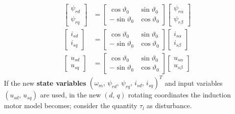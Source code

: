 \documentclass[11pt,a4paper,oneside]{book}
\numberwithin{equation}{section}
\theoremstyle{it}
\theoremstyle{definition}
\begin{document}
\begin{equation}\label{im_eq_40}
	\begin{aligned}
		\left[
		\begin{matrix}
			\psi_{rd} \\[6pt]
			\psi_{rq}
		\end{matrix}
		\right] & =
		\left[
		\begin{matrix}
			\cos\vartheta_0 & \sin\vartheta_0 \\[6pt]
			-\sin\vartheta_0 & \cos\vartheta_0 
		\end{matrix}
		\right]
		\left[
		\begin{matrix}
			\psi_{r\alpha} \\[6pt]
			\psi_{r\beta}
		\end{matrix}
		\right] \\[6pt]
		\left[
		\begin{matrix}
			i_{sd} \\[6pt]
			i_{sq}
		\end{matrix}
		\right] & =
		\left[
		\begin{matrix}
			\cos\vartheta_0 & \sin\vartheta_0 \\[6pt]
			-\sin\vartheta_0 & \cos\vartheta_0 
		\end{matrix}
		\right]
		\left[
		\begin{matrix}
			i_{s\alpha} \\[6pt]
			i_{s\beta}
		\end{matrix}
		\right] \\[6pt]
		\left[
		\begin{matrix}
			u_{sd} \\[6pt]
			u_{sq}
		\end{matrix} 
		\right] & = 
		\left[
		\begin{matrix}
			\cos\vartheta_0 & \sin\vartheta_0 \\[6pt]
			-\sin\vartheta_0 & \cos\vartheta_0
		\end{matrix}
		\right]
		\left[
		\begin{matrix}
			u_{s\alpha} \\[6pt]
			u_{s\beta}
		\end{matrix}
		\right]
	\end{aligned}
\end{equation}
If the new \textbf{state variables} 
$(\omega_m,\,\psi_{rd},\,\psi_{rq},\,i_{sd},\,i_{sq})^T$ and input variables 
$(u_{sd},\,u_{sq})$ are used, in the new $(d,\,q)$ rotating coordinates the 
induction motor model becomes; consider the quantity $\tau_l$ as disturbance.
\end{document}
